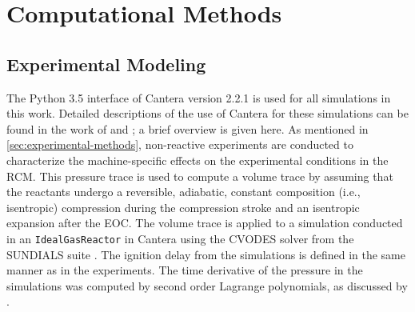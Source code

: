 \documentclass[12pt]{../ussci}
\begin{document}

\section{Computational Methods}\label{sec:computational-methods}
\subsection{Experimental Modeling}\label{sec:experimental-modeling}

The Python 3.5 interface of Cantera \autocite{cantera} version 2.2.1 is used for
all simulations in this work. Detailed descriptions of the use of Cantera for
these simulations can be found in the work of \textcite{Weber2016a} and
\textcite{Dames2016}; a brief overview is given here. As mentioned in
\cref{sec:experimental-methods}, non-reactive experiments are conducted to
characterize the machine-specific effects on the experimental conditions in the
RCM. This pressure trace is used to compute a volume trace by assuming that the
reactants undergo a reversible, adiabatic, constant composition (i.e.,
isentropic) compression during the compression stroke and an isentropic
expansion after the EOC. The volume trace is applied to a simulation conducted
in an \verb|IdealGasReactor| in Cantera \autocite{cantera} using the CVODES
solver from the SUNDIALS suite \autocite{Hindmarsh2005}. The ignition delay from
the simulations is defined in the same manner as in the experiments. The time
derivative of the pressure in the simulations was computed by second order
Lagrange polynomials, as discussed by \textcite{Chapra2010}.
\end{document}
